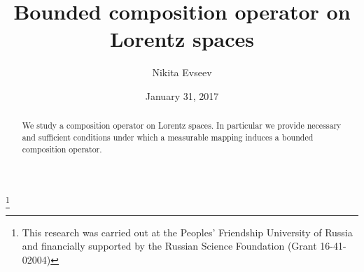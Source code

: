 \documentclass{birkjour}
\theoremstyle{definition}
\theoremstyle{remark}
\numberwithin{equation}{section}
\begin{document}
%
%
%
%
%
%
%
%
%


\title[Bounded composition operator on Lorentz spaces]
 {Bounded composition operator on Lorentz spaces}



\author{Nikita Evseev}

\address{%
Sobolev Institute of Mathematics\\
4 Acad. Koptyug avenue\\
630090 Novosibirsk\\
Russia}


\thanks{This research was carried out at the Peoples' Friendship University of Russia
and financially supported by the Russian Science Foundation (Grant 16-41-02004)}


\date{January 31, 2017}

\begin{abstract}
We study a composition operator on Lorentz spaces.
In particular we provide necessary and sufficient conditions under which a measurable
mapping induces a bounded composition operator.
\end{abstract}

\maketitle
\end{document}
